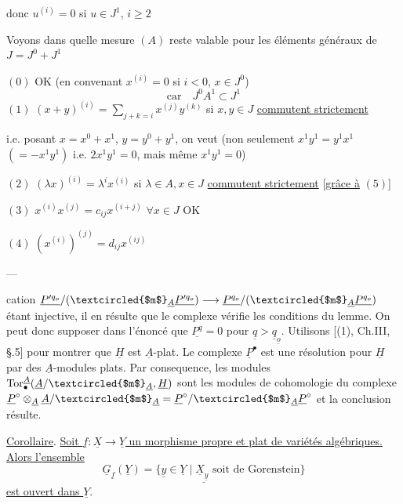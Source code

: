 donc $u^{(i)}=0$ si $u\in J^1$, $i\geq2$

Voyons dans quelle mesure $(A)$ reste valable pour les éléments généraux de $J=J^0+J^1$

$(0)$ OK (en convenant $x^{(i)}=0$ si $i<0$, $x\in J^0$)
\[
\text{car}\quad J^0A^1\subset J^1
\]
$(1)$ $(x+y)^{(i)}=\sum_{j+k=i}x^{(j)}y^{(k)}$ si $x,y\in J$ \uline{commutent strictement}


i.e. posant $x=x^0+x^1$, $y=y^0+y^1$, on veut (non seulement $x^1y^1=y^1x^1$  $(=-x^1y^1)$ i.e. $2x^1y^1=0$, mais même $x^1y^1=0$)

$(2)$ $(\lambda x)^{(i)}=\lambda^i x^{(i)}$ si $\lambda\in A,x\in J$ \uline{commutent strictement} [\uline{grâce à} $(5)$]

$(3)$  $x^{(i)}x^{(j)}=c_{ij}x^{(i+j)}$ \hfill $\forall x\in J$ OK

$(4)$ $(x^{(i)})^{(j)}=d_{ij}x^{(ij)}$

\begin{center}----\end{center}

cation $\underline{P'^{q_o}}/(\textcircled{$m$}_{\underline A}\underline{P'^{q_o}})\longrightarrow\underline{P^{q_o}}/(\textcircled{$m$}_{\underline A}\underline{P^{q_o}})$ étant injective, il en résulte que le complexe
vérifie les conditions du lemme. On peut donc supposer dans l'énoncé que $\underline{P^q}=0$ pour $\underline q>\underline q_{\underline o}$. Utilisons [(1), Ch.III, §.5] pour montrer que $\underline H$ est $\underline A$-plat. Le complexe $\underline P^\bullet$ est une résolution pour $\underline H$ par des $\underline A$-modules plats. Par consequence, les modules $\operatorname{Tor}^{\underline A}_{\bullet}(\underline A/\textcircled{$m$}_{\underline A},\underline H)$ sont les modules de cohomologie du complexe $\underline P^\circ\otimes_{\underline A}\underline A/\textcircled{$m$}_{\underline A}=\underline P^\circ/\textcircled{$m$}_{\underline A}\underline P^\circ$ et la conclusion résulte.

\uline{Corollaire}. \uline{Soit $\underline f:\underline X\longrightarrow\underline Y$ un morphisme propre et plat de variétés algébriques. Alors l'ensemble}
\[
\underline{\underline G_{\underline f}(\underline Y)=\{\underline y\in\underline Y\mid\underline X_{\underline y}\text{ soit de Gorenstein}\}}
\]
\uline{est ouvert dans $\underline Y$}.

